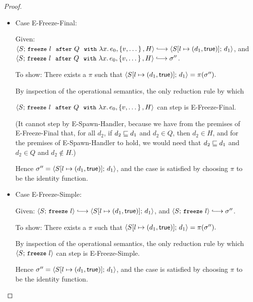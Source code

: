 \begin{proof}
\begin{itemize}
  \item Case {\sc E-Freeze-Final}:

    Given: $\config{S}{\freezeafterfull{l}{Q}{\lam{x}{e_0}}{\setof{v,
          \dots}}{H}} \parstepsto
    \config{\extS{S}{l}{d_1}{\frozentrue}}{d_1}$, and
    $\config{S}{\freezeafterfull{l}{Q}{\lam{x}{e_0}}{\setof{v,
          \dots}}{H}} \parstepsto \conf''$.

    To show: There exists a $\pi$ such that
    $\langle S[l \mapsto (d_1, \textsf{true})];\, d_1 \rangle = \pi(\sigma'').$

    By inspection of the operational semantics, the only reduction
    rule by which

    $\langle S;\, \mbox{\small{\texttt{freeze}}}~l~~{\mbox{\small{\texttt{after}}}}~Q~~{\mbox{\small{\texttt{with}}}}~\lambda x.\,e_0, \left\{v,
          \dots\right\}, H \rangle$ can step is {\sc E-Freeze-Final}.

    (It cannot step by {\sc E-Spawn-Handler}, because we have from the
    premises of {\sc E-Freeze-Final} that, for all $d_2$, if $d_2
    \sqsubseteq d_1$ and $d_2 \in Q$, then $d_2 \in H$, and for the
    premises of {\sc E-Spawn-Handler} to hold, we would need that $d_2
    \sqsubseteq d_1$ and $d_2 \in Q$ and $d_2 \notin H$.)

    Hence $\sigma'' = \langle S[l \mapsto (d_1, \textsf{true})];\, d_1 \rangle$, and
    the case is satisfied by choosing $\pi$ to be the identity
    function.

  \item Case {\sc E-Freeze-Simple}:

    Given: $\config{S}{\freeze{l}} \parstepsto
    \config{\extS{S}{l}{d_1}{\frozentrue}}{d_1}$, and
    $\config{S}{\freeze{l}} \parstepsto \conf''$.

    To show: There exists a $\pi$ such that
    $\langle S[l \mapsto (d_1, \textsf{true})];\, d_1 \rangle = \pi(\sigma'').$

    By inspection of the operational semantics, the only reduction
    rule by which $\langle S;\, \mbox{\small{\texttt{freeze}}}~l \rangle$ can step is {\sc
      E-Freeze-Simple}.

    Hence $\sigma'' = \langle S[l \mapsto (d_1, \textsf{true})];\, d_1 \rangle$, and
    the case is satisfied by choosing $\pi$ to be the identity
    function.

  \end{itemize}
\end{proof}

